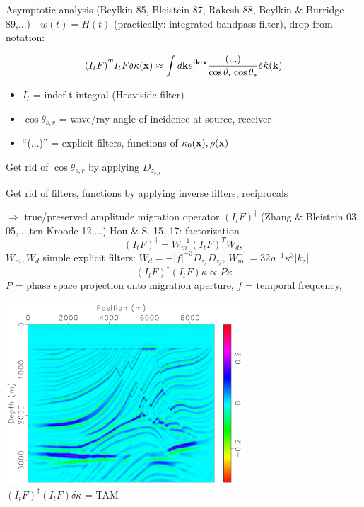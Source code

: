 \documentclass[xcolor=dvipsnames,12pt,aspectratio=169]{beamer}
\begin{document}
\begin{frame}
Asymptotic analysis
(Beylkin 85, Bleistein 87, Rakesh 88, Beylkin \& Burridge 89,...) - $w(t)=H(t)$ (practically: integrated bandpass filter), drop from notation:

\[
(I_tF)^TI_tF\delta \kappa(\mathbf{x}) \approx \int d{\bf k} e^{i {\bf k}\cdot \mathbf{x}} \frac{(...)}{\cos \theta_r \cos \theta_s} \delta \hat{\kappa}({\bf k})
\]
\begin{itemize}
\item $I_t$ = indef t-integral (Heaviside filter)
\item $\cos \theta_{s,r}$ = wave/ray angle of incidence at source, receiver
\item ``(...)'' = explicit filters,  functions of $\kappa_0(\mathbf{x}),\rho(\mathbf{x})$
\end{itemize}
\end{frame}

\begin{frame}
Get rid of $\cos \theta_{s,r}$ by applying $D_{z_{s,r}}$ 

Get rid of filters, functions by applying inverse filters, reciprocals

$\Rightarrow$  true/preserved amplitude migration operator $(I_tF)^{\dagger}$ (Zhang \& Bleistein 03, 05,...,ten Kroode 12,...) Hou \& S. 15, 17: factorization
\[
(I_tF)^{\dagger} = W_m^{-1} (I_tF)^T W_d, 
\]
$W_m, W_d$ simple explicit filters: $W_d =  -|f|^{-3} D_{z_s} D_{z_r},\, W_m^{-1} = 32 \rho^{-1}\kappa^3 |k_z|$
\[
(I_tF)^{\dagger}(I_tF) \kappa \propto P \kappa
\]
$P$ = phase space projection onto migration aperture, $f$ = temporal frequency, 
\end{frame}

\begin{frame}
\vspace{-0.62cm}
\begin{center}
\includegraphics[height=6.8cm]{Fig/fine1bulkinvp1it0}\\
$(I_tF)^{\dagger}(I_tF)\delta \kappa$ = TAM
\end{center}
\end{frame}
\end{document}

